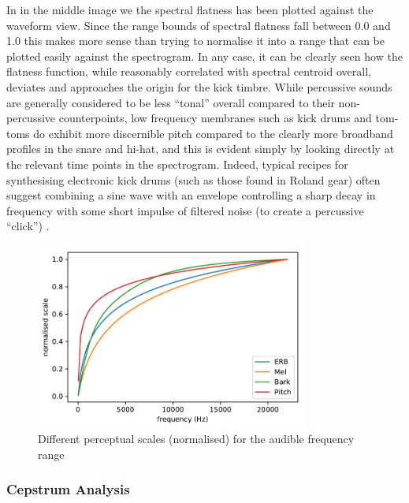 {{In  in the middle image we the spectral flatness has been plotted against the waveform view. Since the range bounds of spectral flatness fall between 0.0 and 1.0 this makes more sense than trying to normalise it into a range that can be plotted easily against the spectrogram. In any case, it can be clearly seen how the flatness function, while reasonably correlated with spectral centroid overall, deviates and approaches the origin for the kick timbre. While percussive sounds are generally considered to be less ``tonal'' overall compared to their non-percussive counterpoints, low frequency membranes such as kick drums and tom-toms do exhibit more discernible pitch compared to the clearly more broadband profiles in the snare and hi-hat, and this is evident simply by looking directly at the relevant time points in the spectrogram. Indeed, typical recipes for synthesising electronic kick drums (such as those found in Roland gear) often suggest combining a sine wave with an envelope controlling a sharp decay in frequency with some short impulse of filtered noise (to create a percussive ``click'') \citep{Risset1999, Reid2002}.

\begin{figure}
	\begin{center}
		\includegraphics[width=0.8\textwidth]{ch05_pyconcat/figures/scale.pdf}
	\end{center}
	\caption[Perceptual Scales for Audible Range]{Different perceptual scales (normalised) for the audible frequency range}
	\label{fig:perceptual_scales}
\end{figure}


\subsubsection{Cepstrum Analysis}

}}
